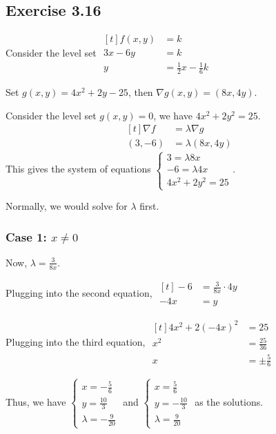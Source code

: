 {~~~}

\subsection*{Exercise 3.16}

Consider the level set 
$\begin{aligned}[t]
    f(x, y) & = k                            \\
    3x - 6y & = k                            \\
    y       & = \frac{1}{2} x - \frac{1}{6}k
\end{aligned}$

Set $g(x, y) = 4x^2 + 2y - 25$, then $\nabla g(x, y) = (8x, 4y)$. 

Consider the level set $g(x, y) = 0$, we have $4x^2 + 2y^2 = 25$.
$$\begin{aligned}[t]
    \nabla f & = \lambda \nabla g \\
    (3, -6)  & = \lambda (8x, 4y)
\end{aligned}$$
This gives the system of equations $\begin{cases} 3 = \lambda 8x \\ -6 = \lambda 4x \\ 4x^2 + 2y^2 = 25 \end{cases}$. 

Normally, we would solve for $\lambda$ first. 

\subsubsection*{Case 1: $x \neq 0$}

Now, $\lambda = \frac{3}{8x}$. 

Plugging into the second equation, $\begin{aligned}[t]
    -6  & = \frac{3}{8x} \cdot 4y \\
    -4x & = y
\end{aligned}$

Plugging into the third equation, $\begin{aligned}[t]
    4x^2 + 2(-4x)^2 & = 25              \\
    x^2             & = \frac{25}{36}   \\
    x               & = \pm \frac{5}{6}
\end{aligned}$

Thus, we have $\begin{cases} x = -\frac{5}{6} \\ y = \frac{10}{3} \\ \lambda = -\frac{9}{20} \end{cases}$ and $\begin{cases} x = \frac{5}{6} \\ y = -\frac{10}{3} \\ \lambda = \frac{9}{20} \end{cases}$ as the solutions. 

